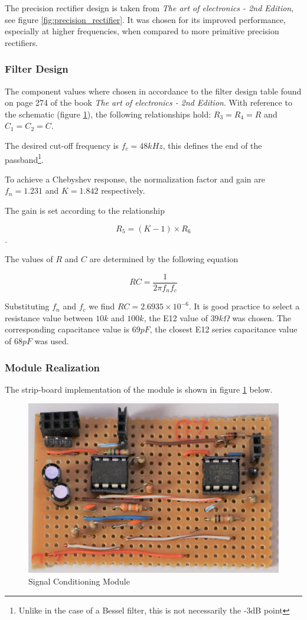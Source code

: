 The precision rectifier design is taken from \textit{The art of electronics - 2nd Edition}, see figure \ref{fig:precision_rectifier}. It was chosen for its improved performance, especially at higher frequencies, when compared to more primitive precision rectifiers.

\subsubsection{Filter Design}

The component values where chosen in accordance to the filter design table found on page 274 of the book \textit{The art of electronics - 2nd Edition}\cite{Horowitz1995}. With reference to the schematic (figure \ref{fig:module_filtering_conditioning}), the following relationships hold: \(R_3 = R_4 = R\) and \(C_1 = C_2 = C\).

The desired cut-off frequency is \(f_{c} = 48kHz\), this defines the end of the passband\footnote{Unlike in the case of a Bessel filter, this is not necessarily the -3dB point}.

To achieve a Chebyshev response, the normalization factor and gain are \(f_n = 1.231\) and \(K = 1.842\) respectively.

The gain is set according to the relationship

\[R_5 = (K - 1) \times R_6\].

The values of $R$ and $C$ are determined by the following equation

\[RC = \frac{1}{2\pi f_n f_c}\]

Substituting $f_n$ and $f_c$ we find $RC = 2.6935\times 10^{-6}$. It is good practice to select a resistance value between $10k$ and $100k$, the E12 value of $39k\Omega$ was chosen. The corresponding capacitance value is $69pF$, the closest E12 series capacitance value of $68pF$ was used.


\subsubsection{Module Realization}
The strip-board implementation of the module is shown in figure \ref{fig:module_filtering_conditioning} below.

\begin{figure}[H]
	\centering
	\includegraphics[width=.6\textwidth]{figures/modules/filtering_conditioning.jpg}
	\caption{Signal Conditioning Module}
	\label{fig:module_filtering_conditioning}
\end{figure}

